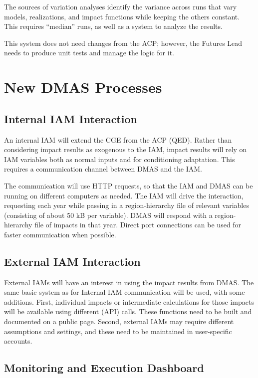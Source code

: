 \documentclass[12pt, oneside]{amsart}
\begin{document}
The sources of variation analyses identify the variance across runs
that vary models, realizations, and impact functions while keeping the
others constant.  This requires ``median'' runs, as well as a system
to analyze the results.

This system does not need changes from the ACP; however, the Futures
Lead needs to produce unit tests and manage the logic for it.

\section{New DMAS Processes}

\subsection{Internal IAM Interaction}
\label{sec:internaliam}

An internal IAM will extend the CGE from the ACP (QED).  Rather than
considering impact results as exogenous to the IAM, impact results
will rely on IAM variables both as normal inputs and for conditioning
adaptation.  This requires a communication channel between DMAS and
the IAM.

The communication will use HTTP requests, so that the IAM and DMAS can
be running on different computers as needed.  The IAM will drive the
interaction, requesting each year while passing in a region-hierarchy
file of relevant variables (consisting of about 50 kB per variable).
DMAS will respond with a region-hierarchy file of impacts in that
year.  Direct port connections can be used for faster communication
when possible.

\subsection{External IAM Interaction}
\label{sec:externaliam}

External IAMs will have an interest in using the impact results from
DMAS.  The same basic system as for Internal IAM communication will be
used, with some additions.  First, individual impacts or intermediate
calculations for those impacts will be available using different (API)
calls.  These functions need to be built and documented on a public
page.  Second, external IAMs may require different assumptions and
settings, and these need to be maintained in user-specific accounts.

\subsection{Monitoring and Execution Dashboard}
\label{sec:dashboard}
\end{document}
